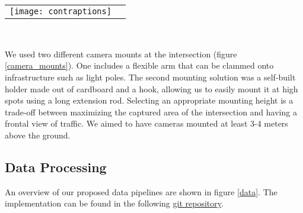 \ \\





\ \\ 
\raggedbottom
\begin{tabular}{@{}cc}
\texttt{[image: contraptions]}
\end{tabular}
\label{camera_mounts}
\

We used two different camera mounts at the intersection (figure \ref{camera_mounts}). One includes a flexible arm that can be clammed onto infrastructure such as light poles.
The second mounting solution was a self-built holder made out of cardboard and a hook, allowing us to easily mount it at high spots using a long extension rod.
Selecting an appropriate mounting height is a trade-off between maximizing the captured area of the intersection and having a frontal view of traffic.
We aimed to have cameras mounted at least 3-4 meters above the ground.

\subsection{Data Processing}
An overview of our proposed data pipelines are shown in figure \ref{data}. 
The implementation can be found in the following \href{https://github.com/edibegovic/cyclist-behaviourCPH-2021}{git repository}.

